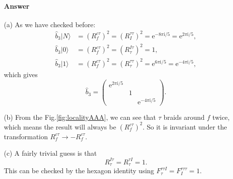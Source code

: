 \documentclass{book}
\begin{document}
\paragraph{Answer}
(a) As we have checked before:
\begin{equation*}
\begin{aligned}
\hat{b}_{3} |N\rangle  & =(R_{f}^{c\tau } )^{2} =(R_{I}^{\tau \tau } )^{2} =\mathrm{e}^{-8\pi \mathrm{i} /5} =\mathrm{e}^{2\pi \mathrm{i} /5} ,\\
\hat{b}_{3} |0\rangle  & =(R_{f}^{c\tau } )^{2} =(R_{\tau }^{I\tau } )^{2} =1,\\
\hat{b}_{3} |1\rangle  & =(R_{f}^{c\tau } )^{2} =(R_{\tau }^{\tau \tau } )^{2} =\mathrm{e}^{6\pi \mathrm{i} /5} =\mathrm{e}^{-4\pi \mathrm{i} /5} ,
\end{aligned}
\end{equation*}
which gives
\begin{equation*}
\hat{b}_{3} =\begin{pmatrix}
\mathrm{e}^{2\pi \mathrm{i} /5} &  & \\
 & 1 & \\
 &  & \mathrm{e}^{-4\pi \mathrm{i} /5}
\end{pmatrix} .
\end{equation*}


(b) From the Fig.\ref{fig:localityAAA}, we can see that $\tau $ braids around $f$ twice, which means the result will always be $(R_{f}^{c\tau } )^{2}$. So it is invariant under the transformation $R_{f}^{c\tau }\rightarrow -R_{f}^{c\tau }$. 



(c) A fairly trivial guess is that
\begin{equation*}
R_{\tau }^{I\tau } =R_{\tau }^{\tau I} =1.
\end{equation*}
This can be checked by the hexagon identity using $F_{\tau }^{\tau \tau I} =F_{I}^{\tau \tau \tau } =1$. 
\end{document}
